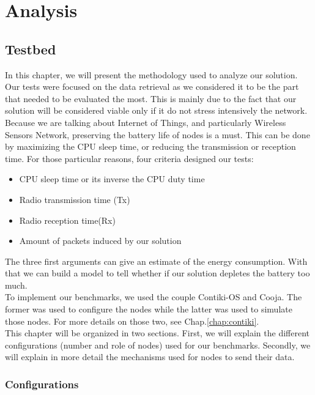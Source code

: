 \part{Analysis}  \label{part:analysis}

\chapter{Testbed}

In this chapter, we will present the methodology used to analyze our solution. Our tests were focused on the data retrieval as we considered it to be the part that needed to be evaluated the most. This is mainly due to the fact that our solution will be considered viable only if it do not stress intensively the network. Because we are talking about Internet of Things, and particularly Wireless Sensors Network, preserving the battery life of nodes is a must. This can be done by maximizing the CPU sleep time, or reducing the transmission or reception time. For those particular reasons, four criteria designed our tests:

\begin{itemize}
  \item CPU sleep time or its inverse the CPU duty time
  \item Radio transmission time (Tx)
  \item Radio reception time(Rx)
  \item Amount of packets induced by our solution \\
\end{itemize}

The three first arguments can give an estimate of the energy consumption. With that we can build a model to tell whether if our solution depletes the battery too much.\\

To implement our benchmarks, we used the couple Contiki-OS and Cooja. The former was used to configure the nodes while the latter was used to simulate those nodes. For more details on those two, see Chap.\ref{chap:contiki}.\\

This chapter will be organized in two sections. First, we will explain the different configurations (number and role of nodes) used for our benchmarks. Secondly, we will explain in more detail the mechanisms used for nodes to send their data.

\section{Configurations}

